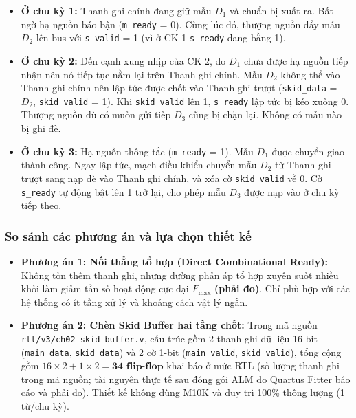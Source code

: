 \begin{itemize}[leftmargin=1.5em, itemsep=2pt]
    \item \textbf{Ở chu kỳ 1:} Thanh ghi chính đang giữ mẫu $D_1$ và chuẩn bị xuất ra. Bất ngờ hạ nguồn báo bận (\texttt{m\_ready} = 0). Cùng lúc đó, thượng nguồn đẩy mẫu $D_2$ lên bus với \texttt{s\_valid} = 1 (vì ở CK 1 \texttt{s\_ready} đang bằng 1).
    \item \textbf{Ở chu kỳ 2:} Đến cạnh xung nhịp của CK 2, do $D_1$ chưa được hạ nguồn tiếp nhận nên nó tiếp tục nằm lại trên Thanh ghi chính. Mẫu $D_2$ không thể vào Thanh ghi chính nên lập tức được chốt vào Thanh ghi trượt (\texttt{skid\_data} = $D_2$, \texttt{skid\_valid} = 1). Khi \texttt{skid\_valid} lên 1, \texttt{s\_ready} lập tức bị kéo xuống 0. Thượng nguồn dù có muốn gửi tiếp $D_3$ cũng bị chặn lại. Không có mẫu nào bị ghi đè.
    \item \textbf{Ở chu kỳ 3:} Hạ nguồn thông tắc (\texttt{m\_ready} = 1). Mẫu $D_1$ được chuyển giao thành công. Ngay lập tức, mạch điều khiển chuyển mẫu $D_2$ từ Thanh ghi trượt sang nạp đè vào Thanh ghi chính, và xóa cờ \texttt{skid\_valid} về 0. Cờ \texttt{s\_ready} tự động bật lên 1 trở lại, cho phép mẫu $D_3$ được nạp vào ở chu kỳ tiếp theo.
\end{itemize}

\subsubsection*{So sánh các phương án và lựa chọn thiết kế}
\begin{itemize}[leftmargin=1.5em, itemsep=2pt]
    \item \textbf{Phương án 1: Nối thẳng tổ hợp (Direct Combinational Ready):} Không tốn thêm thanh ghi, nhưng đường phản áp tổ hợp xuyên suốt nhiều khối làm giảm tần số hoạt động cực đại $F_{\max}$ \textbf{(phải đo)}. Chỉ phù hợp với các hệ thống có ít tầng xử lý và khoảng cách vật lý ngắn.
    \item \textbf{Phương án 2: Chèn Skid Buffer hai tầng chốt:} Trong mã nguồn\\ \texttt{rtl/v3/ch02\_skid\_buffer.v}, cấu trúc gồm 2 thanh ghi dữ liệu 16-bit (\texttt{main\_data}, \texttt{skid\_data}) và 2 cờ 1-bit (\texttt{main\_valid}, \texttt{skid\_valid}), tổng cộng gồm $16 \times 2 + 1 \times 2 = \textbf{34 flip-flop}$ khai báo ở mức RTL (số lượng thanh ghi trong mã nguồn; tài nguyên thực tế sau đóng gói ALM do Quartus Fitter báo cáo và phải đo). Thiết kế không dùng M10K và duy trì 100\% thông lượng (1 từ/chu kỳ).
\end{itemize}

